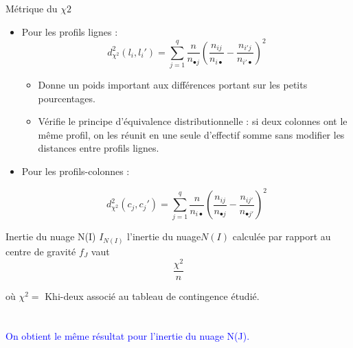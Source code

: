 \documentclass[11pt]{beamer}
\begin{document}
\begin{frame}{Métrique du $\chi 2$}

\begin{itemize}
\item Pour les profils lignes :\\

$$d^2_{\chi^2}(l_i,l_i')=\sum_{j=1}^{q}\frac{n}{n_{\bullet j}}(\frac{n_{ij}}{n_{i \bullet}}-\frac{n_{i'j}}{n_{i' \bullet}})^2  $$

\begin{itemize}
\item Donne un poids important aux différences portant sur les
petits pourcentages.
\item  Vérifie le principe d’équivalence distributionnelle : si deux
colonnes ont le même profil, on les réunit en une seule
d’effectif somme sans modifier les distances entre profils lignes.
\end{itemize}

\item Pour les profils-colonnes :

$$d^2_{\chi^2}(c_j,c_j')=\sum_{j=1}^{q}\frac{n}{n_{i \bullet }}(\frac{n_{ij}}{n_{\bullet j}}-\frac{n_{ij'}}{n_{ \bullet j'}})^2  $$       
       
\end{itemize}
\end{frame}
\begin{frame}{Inertie du nuage N(I)}
$I_{N(I)}$  l’inertie du nuage$ N(I)$ calculée par rapport
au centre de gravité $f_J$ vaut $$\frac{\chi^2}{n}$$

où $\chi^2=$ Khi-deux associé au tableau de contingence étudié.\\~\\~\\

\textcolor{blue}{On obtient le même résultat pour l’inertie du nuage N(J).}

\end{frame}
\end{document}
